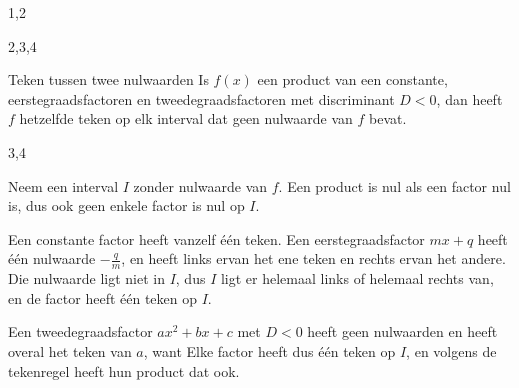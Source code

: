 \begin{alleenvoor}{1,2}

\end{alleenvoor}
\begin{alleenvoor}{2,3,4}
\begin{theorie}
\begin{stelling}{Teken tussen twee nulwaarden}
Is $f(x)$ een product van een constante, eerstegraadsfactoren en tweedegraadsfactoren met discriminant $D < 0$, dan heeft $f$ hetzelfde teken op elk interval dat geen nulwaarde van $f$ bevat.
\end{stelling}

\begin{alleenvoor}{3,4}
\begin{bewijs}
Neem een interval $I$ zonder nulwaarde van $f$. Een product is nul als een factor nul is, dus ook geen enkele factor is nul op $I$.

Een constante factor heeft vanzelf één teken. Een eerstegraadsfactor $mx + q$ heeft één nulwaarde $-\frac{q}{m}$, en heeft links ervan het ene teken en rechts ervan het andere. Die nulwaarde ligt niet in $I$, dus $I$ ligt er helemaal links of helemaal rechts van, en de factor heeft één teken op $I$.

Een tweedegraadsfactor $ax^2 + bx + c$ met $D < 0$ heeft geen nulwaarden en heeft overal het teken van $a$, want
Elke factor heeft dus één teken op $I$, en volgens de tekenregel heeft hun product dat ook.
\end{bewijs}
\end{alleenvoor}
\end{theorie}

\end{alleenvoor}
